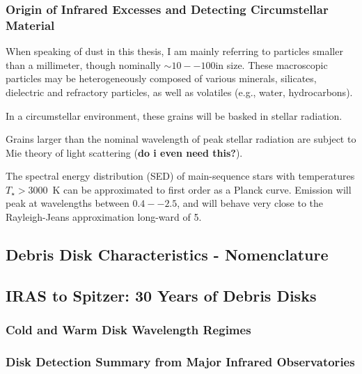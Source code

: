   
        \subsubsection{Origin of  Infrared Excesses and Detecting Circumstellar Material}\label{sec:excess_detection}
            When speaking of dust in this thesis, I am mainly referring to particles smaller than a millimeter, though nominally $\sim10--100$\microns in size. These macroscopic particles may be heterogeneously composed of various minerals, silicates, dielectric and refractory particles, as well as volatiles (e.g., water, hydrocarbons). 
            
            In a circumstellar environment, these grains will be basked in stellar radiation. 
            
            
            Grains larger than the nominal wavelength of peak stellar radiation are subject to Mie theory of light scattering (\textbf{do i even need this?}). 
            
            
            The spectral energy distribution (SED) of main-sequence stars with temperatures $T_\star>3000$~K can be approximated to first order as a Planck curve. Emission will peak at wavelengths between $0.4 -- 2.5$\micron, and will behave very close to the Rayleigh-Jeans approximation long-ward of 5\micron. 
            
            
    \subsection{Debris Disk Characteristics - Nomenclature}        
        
    \subsection{IRAS to Spitzer: 30 Years of Debris Disks}\label{sec:30years}
    
        \subsubsection{Cold and Warm Disk Wavelength Regimes}

        \subsubsection{Disk Detection Summary from Major Infrared Observatories}\label{sec:IR_observatories}
        
